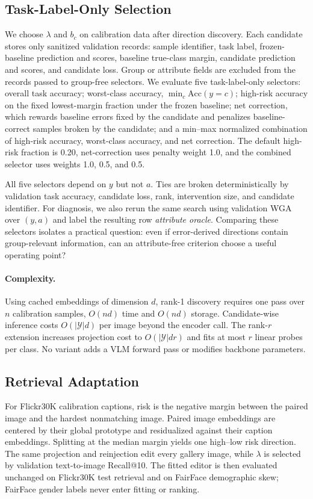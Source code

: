 \subsection{Task-Label-Only Selection}
We choose $\lambda$ and $b_c$ on calibration data after direction discovery. Each candidate stores only sanitized validation records: sample identifier, task label, frozen-baseline prediction and scores, baseline true-class margin, candidate prediction and scores, and candidate loss. Group or attribute fields are excluded from the records passed to group-free selectors. We evaluate five task-label-only selectors: overall task accuracy; worst-class accuracy, $\min_c \mathrm{Acc}(y=c)$; high-risk accuracy on the fixed lowest-margin fraction under the frozen baseline; net correction, which rewards baseline errors fixed by the candidate and penalizes baseline-correct samples broken by the candidate; and a min--max normalized combination of high-risk accuracy, worst-class accuracy, and net correction. The default high-risk fraction is 0.20, net-correction uses penalty weight 1.0, and the combined selector uses weights 1.0, 0.5, and 0.5.

All five selectors depend on $y$ but not $a$. Ties are broken deterministically by validation task accuracy, candidate loss, rank, intervention size, and candidate identifier. For diagnosis, we also rerun the same search using validation WGA over $(y,a)$ and label the resulting row \emph{attribute oracle}. Comparing these selectors isolates a practical question: even if error-derived directions contain group-relevant information, can an attribute-free criterion choose a useful operating point?

\paragraph{Complexity.}
Using cached embeddings of dimension $d$, rank-1 discovery requires one pass over $n$ calibration samples, $O(nd)$ time and $O(nd)$ storage. Candidate-wise inference costs $O(|\mathcal{Y}|d)$ per image beyond the encoder call. The rank-$r$ extension increases projection cost to $O(|\mathcal{Y}|dr)$ and fits at most $r$ linear probes per class. No variant adds a VLM forward pass or modifies backbone parameters.

\subsection{Retrieval Adaptation}
For Flickr30K calibration captions, risk is the negative margin between the paired image and the hardest nonmatching image. Paired image embeddings are centered by their global prototype and residualized against their caption embeddings. Splitting at the median margin yields one high--low risk direction. The same projection and reinjection edit every gallery image, while $\lambda$ is selected by validation text-to-image Recall@10. The fitted editor is then evaluated unchanged on Flickr30K test retrieval and on FairFace demographic skew; FairFace gender labels never enter fitting or ranking.
